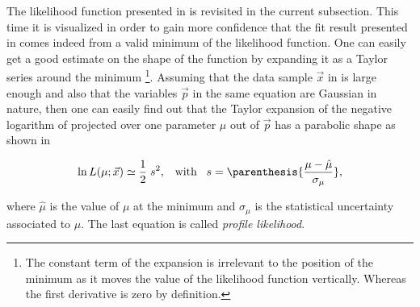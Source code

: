 The likelihood function presented in  is revisited in the current subsection.
This time it is visualized in order to gain more confidence that the fit result presented in 
comes indeed from a valid minimum of the likelihood function. One can easily get a good estimate on the shape of the function
by expanding it as a Taylor series around the
minimum \footnote{The constant term of the
expansion is irrelevant to the position of the minimum as it moves the value of the likelihood function vertically. Whereas
the first derivative is zero by definition.}. Assuming that the data sample $\vec{x}$ in  is large enough
and also that the variables $\vec{p}$ in the same equation are Gaussian in nature, then one can easily find out that the
Taylor expansion of the negative logarithm of  projected over one parameter $\mu$ out of $\vec{p}$ has a
parabolic shape as shown in 

\begin{equation}
\ln L(\mu;\vec{x}) \simeq \frac{1}{2} \; s^2, \;\;\; \text{with} \;\;\; s = \parenthesis{\frac{\mu-\hat{\mu}}{\sigma_{\mu}}},
\label{likelihood_exp}
\end{equation}

\noindent where $\hat{\mu}$ is the value of $\mu$ at the minimum and $\sigma_{\mu}$ is the statistical uncertainty associated
to $\mu$. The last equation is called {\it profile likelihood}.

